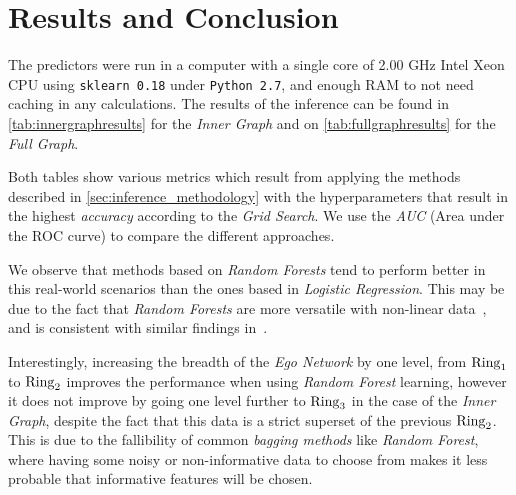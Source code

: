 \section{Results and Conclusion}
\label{sec:results}


The predictors were run in a computer with a single core of 2.00 GHz Intel Xeon CPU using \texttt{sklearn 0.18} under \texttt{Python 2.7}, and enough RAM to not need caching in any calculations. The results of the inference can be found in \cref{tab:innergraphresults} for the \emph{Inner Graph} and on \cref{tab:fullgraphresults} for the \emph{Full Graph}.


Both tables show various metrics which result from applying the methods described in \cref{sec:inference_methodology} with the hyperparameters that result in the highest \emph{accuracy} according to the \emph{Grid Search}.
We use the \emph{AUC} (Area under the ROC curve) to compare the different approaches.

We observe that methods based on \emph{Random Forests} tend to perform better in this real-world scenarios than the ones based in \emph{Logistic Regression}.
This may be due to the fact that \emph{Random Forests} are more versatile with non-linear data~\cite{logisticvsdecision}, and is consistent with similar findings in~\cite{muchlinski2016}.

Interestingly, increasing the breadth of the \emph{Ego Network} by one level, from $\operatorname{Ring}_1$ to $\operatorname{Ring}_2$ improves the performance when using \emph{Random Forest} learning, however it does not improve by going one level further to $\operatorname{Ring}_3$ in the case of the \emph{Inner Graph}, despite the fact that this data is a strict superset of the previous $\operatorname{Ring}_2$. This is due to the fallibility of common \emph{bagging methods} like \emph{Random Forest}, where having some noisy or non-informative data to choose from makes it less probable that informative features will be chosen.

